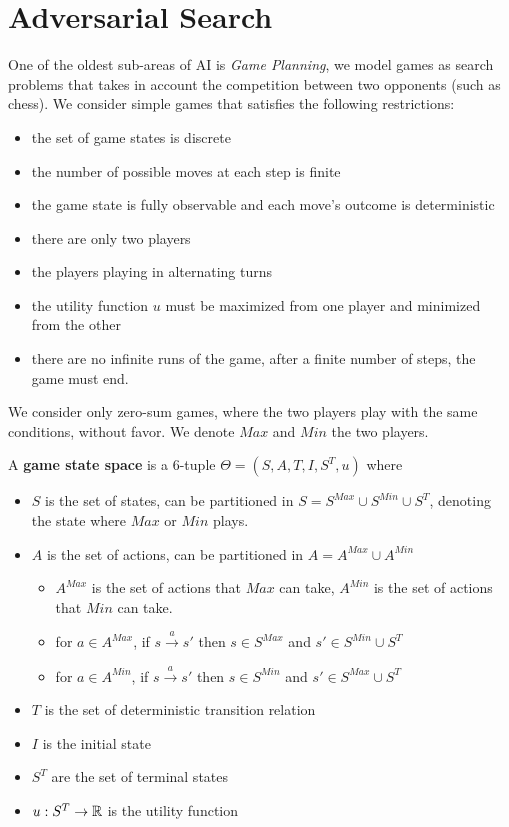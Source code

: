 \documentclass[10pt, letterpaper]{report}
\begin{document}
\section{Adversarial Search}
One of the oldest sub-areas of AI is \textit{Game Planning}, we model games as search problems that takes in account the competition between two opponents (such as chess). We consider simple games that satisfies the following restrictions:\begin{itemize}
    \item the set of game states is discrete 
    \item the number of possible moves at each step is finite 
    \item the game state is fully observable and each move's outcome is deterministic
    \item there are only two players
    \item the players playing in alternating turns 
    \item the utility function $u$ must be maximized from one player and minimized from the other 
    \item there are no infinite runs of the game, after a finite number of steps, the game must end.
\end{itemize}
We consider only zero-sum games, where the two players play with the same conditions, without favor. We denote $Max$ and $Min$ the two players.\begin{definition}
    A \textbf{game state space} is a 6-tuple $\Theta=(S,A,T,I,S^T,u)$ where\end{definition}\begin{itemize}
        \item $S$ is the set of states, can be partitioned in $S=S^{Max}\cup S^{Min}\cup S^T$, denoting the state where $Max$ or $Min$ plays.
        \item $A$ is the set of actions, can be partitioned in $A=A^{Max}\cup A^{Min}$\begin{itemize}
        \item $A^{Max}$ is the set of actions that $Max$ can take, $A^{Min}$ is the set of actions that $Min$ can take. 
            \item for $a\in A^{Max}$, if $s\xrightarrow{a} s'$ then $s\in S^{Max}$ and $s'\in S^{Min}\cup S^T$
            \item for $a\in A^{Min}$, if $s\xrightarrow{a} s'$ then $s\in S^{Min}$ and $s'\in S^{Max}\cup S^T$
        \end{itemize}
        \item $T$ is the set of deterministic transition relation
        \item $I$ is the initial state 
        \item $S^T$ are the set of terminal states
        \item $u:S^T\rightarrow{\mathbb R}$ is the utility function
    \end{itemize}
\end{document}
